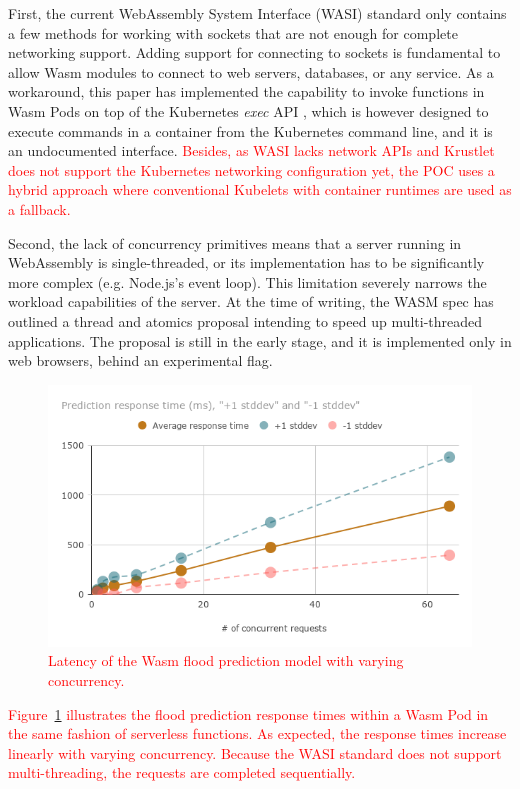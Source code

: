 First, the current WebAssembly System Interface (WASI) standard only contains a few methods for working with sockets that are not enough for complete networking support. Adding support for connecting to sockets is fundamental to allow Wasm modules to connect to web servers, databases, or any service. As a workaround, this paper has implemented the capability to invoke functions in Wasm Pods on top of the Kubernetes \emph{exec} API \cite{k8s-exec}, which is however designed to execute commands in a container from the Kubernetes command line, and it is an undocumented interface. \textcolor{red}{Besides, as WASI lacks network APIs and Krustlet does not support the Kubernetes networking configuration yet, the POC uses a hybrid approach where conventional Kubelets with container runtimes are used as a fallback.}

Second, the lack of concurrency primitives means that a server running in WebAssembly is single-threaded, or its implementation has to be significantly more complex (e.g. Node.js's event loop). This limitation severely narrows the workload capabilities of the server. At the time of writing, the WASM spec has outlined a thread and atomics proposal intending to speed up multi-threaded applications. The proposal is still in the early stage, and it is implemented only in web browsers, behind an experimental flag.

\begin{figure}[ht]
\centering
\includegraphics[width=\columnwidth]{figures/b-krustlet-4}
\caption{\textcolor{red}{Latency of the Wasm flood prediction model with varying concurrency.}} \label{fig:b-krustlet-4}
\end{figure}

\textcolor{red}{Figure~\ref{fig:b-krustlet-4} illustrates the flood prediction response times within a Wasm Pod in the same fashion of serverless functions. As expected, the response times increase linearly with varying concurrency. Because the WASI standard does not support multi-threading, the requests are completed sequentially.}

